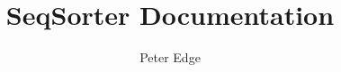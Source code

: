\documentclass[11pt]{article}
\title{\textbf{SeqSorter Documentation}}
\author{Peter Edge}
\begin{document}
\maketitle

\begin{verbatim}

\end{verbatim}
\end{document}
